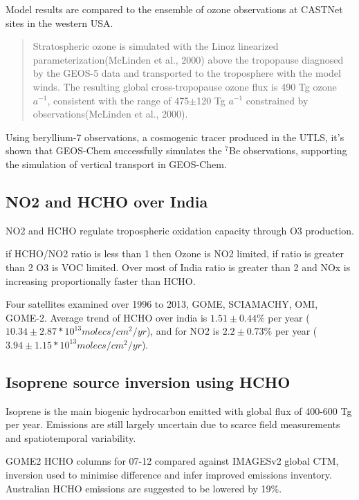 Model results are compared to the ensemble of ozone observations at CASTNet sites in the western USA.

\begin{quote}
Stratospheric ozone is simulated with the Linoz linearized parameterization(McLinden et al., 2000) above the tropopause diagnosed by the GEOS-5 data and transported to the troposphere with the model winds. The resulting global cross-tropopause ozone flux is 490 Tg ozone $a^{−1}$, consistent with the range of 475$\pm$120 Tg $a^{−1}$ constrained by observations(McLinden et al., 2000).
\end{quote}

Using beryllium-7 observations, a cosmogenic tracer produced in the UTLS, it's shown that GEOS-Chem successfully simulates the $^7$Be observations, supporting the simulation of vertical transport in GEOS-Chem.

  
\subsection{NO2 and HCHO over India \cite{Mahajan_2015}}
NO2 and HCHO regulate tropospheric oxidation capacity through O3 production. 

if HCHO/NO2 ratio is less than 1 then Ozone is NO2 limited, if ratio is greater than 2 O3 is VOC limited.
Over most of India ratio is greater than 2 and NOx is increasing proportionally faster than HCHO.

Four satellites examined over 1996 to 2013, GOME, SCIAMACHY, OMI, GOME-2.
Average trend of HCHO over india is $1.51 \pm 0.44\%$ per year ($10.34 \pm 2.87 *10^{13} molecs/cm^2/yr$), and for NO2 is $2.2 \pm 0.73\%$ per year ($3.94 \pm 1.15 *10^{13} molecs/cm^2/yr$).
  
  
\subsection{Isoprene source inversion using HCHO \cite{bauwens2013satellite}}
Isoprene is the main biogenic hydrocarbon emitted with global flux of 400-600 Tg per year. Emissions are still largely uncertain due to scarce field measurements and spatiotemporal variability.

GOME2 HCHO columns for 07-12 compared against IMAGESv2 global CTM, inversion used to minimise difference and infer improved emissions inventory.
Australian HCHO emissions are suggested to be lowered by 19\%.
  
  
  